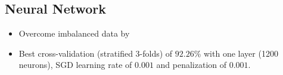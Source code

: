 \documentclass[c]{beamer}
\begin{document}
% 

\subsection{Neural Network}

\begin{frame}
\begin{itemize}
 \item Overcome imbalanced data by 
 \end{itemize}
 \begin{itemize}
  \item Best cross-validation (stratified 3-folds) of $92.26$\% with one layer (1200 neurons), SGD learning rate of $0.001$ and penalization of $0.001$. 
 \end{itemize}
\end{frame}
\end{document}
